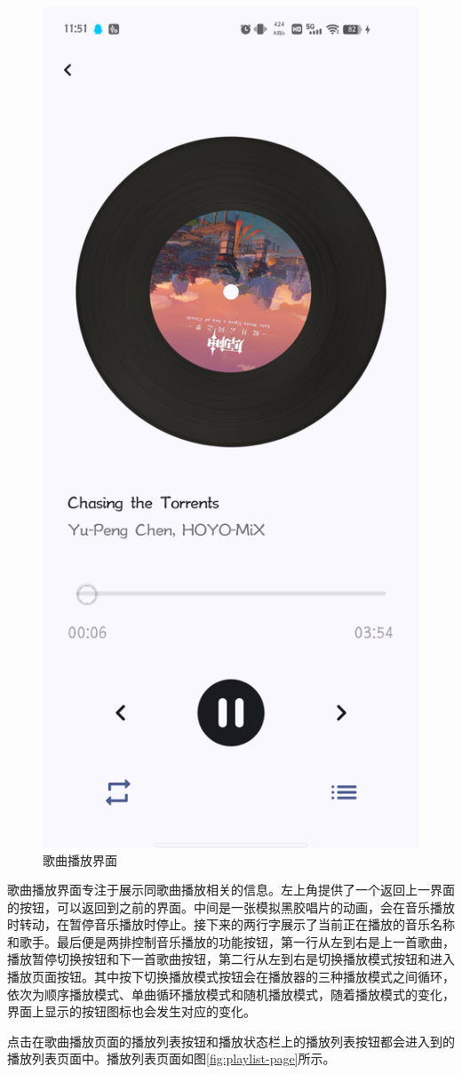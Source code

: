 \documentclass[main.tex]{subfiles}
\begin{document}
\begin{figure}[htbp]
    \centering
    \includegraphics[width=0.4\linewidth]{assets/song-page.png}
    \caption{歌曲播放界面}
    \label{fig:song-page}
\end{figure}

歌曲播放界面专注于展示同歌曲播放相关的信息。左上角提供了一个返回上一界面的按钮，可以返回到之前的界面。中间是一张模拟黑胶唱片的动画，会在音乐播放时转动，在暂停音乐播放时停止。接下来的两行字展示了当前正在播放的音乐名称和歌手。最后便是两排控制音乐播放的功能按钮，第一行从左到右是上一首歌曲，播放暂停切换按钮和下一首歌曲按钮，第二行从左到右是切换播放模式按钮和进入播放页面按钮。其中按下切换播放模式按钮会在播放器的三种播放模式之间循环，依次为顺序播放模式、单曲循环播放模式和随机播放模式，随着播放模式的变化，界面上显示的按钮图标也会发生对应的变化。

点击在歌曲播放页面的播放列表按钮和播放状态栏上的播放列表按钮都会进入到的播放列表页面中。播放列表页面如图\ref{fig:playlist-page}所示。
\end{document}
